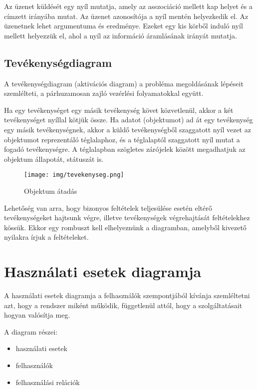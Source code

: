 \documentclass[margin=0px]{article}
\begin{document}
			Az üzenet küldését egy nyíl mutatja, amely az asszociáció mellett kap helyet és a címzett irányába mutat. Az üzenet azonosítója a nyíl mentén helyezkedik el. Az üzenetnek lehet argumentuma és eredménye. Ezeket egy kis körből induló nyíl mellett helyezzük el, ahol a nyíl az információ áramlásának irányát mutatja.
			
			
		\subsection{Tevékenységdiagram}
			A tevékenységdiagram (aktivációs diagram) a probléma megoldásának lépéseit szemlélteti, a párhuzamosan zajló vezérlési folyamatokkal együtt.
			
			Ha egy tevékenységet
			egy másik tevékenység követ közvetlenül, akkor a két tevékenységet
			nyíllal kötjük össze. Ha adatot (objektumot) ad át egy tevékenység
			egy másik tevékenységnek, akkor a küldő tevékenységből szaggatott
			nyíl vezet az objektumot reprezentáló téglalaphoz, és a téglalaptól
			szaggatott nyíl mutat a fogadó tevékenységre. A téglalapban szögletes
			zárójelek között megadhatjuk az objektum állapotát, státuszát is.
			\begin{figure}[H]
				\centering
				\texttt{[image: img/tevekenyseg.png]}
				\caption{Objektum átadás}
			\end{figure}
			
			Lehetőség van arra, hogy bizonyos feltételek teljesülése esetén eltérő
			tevékenységeket hajtsunk végre, illetve tevékenységek végrehajtását
			feltételekhez kössük. Ekkor egy rombuszt kell elhelyeznünk a diagramban,
			amelyből kivezető nyilakra írjuk a feltételeket.
\iffalse			
			\begin{figure}[H]
				\centering
				\texttt{[image: img/tevekenyseg2.png]}
				\caption{Feltétel ábrázolása}
			\end{figure}
\fi
	\section{Használati esetek diagramja}
		A használati esetek diagramja a felhasználók szempontjából kívánja
		szemléltetni azt, hogy a rendszer miként működik, függetlenül attól,
		hogy a szolgáltatásait hogyan valósítja meg.
		
		\noindent
		A diagram részei:
		\begin{itemize}
			\item használati esetek
			\item felhasználók
			\item felhasználási relációk
		\end{itemize}
		
\end{document}
